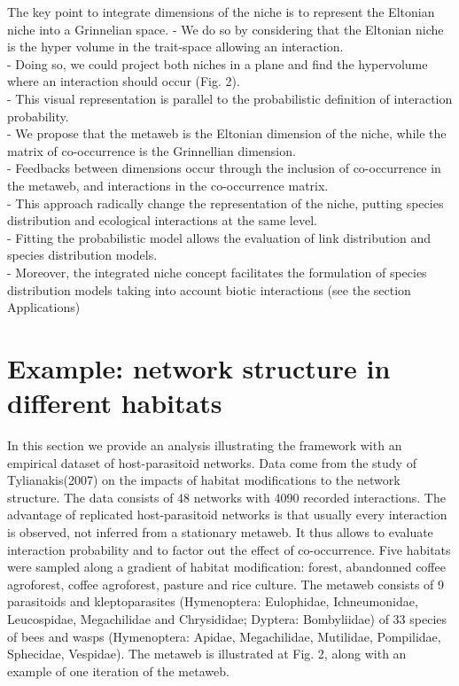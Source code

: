 \documentclass[12pt]{article}
\begin{document}
The key point to integrate dimensions of the niche is to represent the Eltonian niche into a Grinnelian space. 
- We do so by considering that the Eltonian niche is the hyper volume in the trait-space allowing an interaction. \\
- Doing so, we could project both niches in a plane and find the hypervolume where an interaction should occur (Fig. 2). \\
- This visual representation is parallel to the probabilistic definition of interaction probability. \\
- We propose that the metaweb is the Eltonian dimension of the niche, while the matrix of co-occurrence is the Grinnellian dimension. \\
- Feedbacks between dimensions occur through the inclusion of co-occurrence in the metaweb, and interactions in the co-occurrence matrix. \\
- This approach radically change the representation of the niche, putting species distribution and ecological interactions at the same level. \\
- Fitting the probabilistic model allows the evaluation of link distribution and species distribution models. \\
- Moreover, the integrated niche concept facilitates the formulation of species distribution models taking into account biotic interactions (see the section Applications) \\


\newpage
\section*{Example: network structure in different habitats}

In this section we provide an analysis illustrating the framework with an
empirical dataset of host-parasitoid networks. Data come from the study of
Tylianakis(2007) on the impacts of habitat modifications to the network
structure. The data consists of 48 networks with 4090 recorded interactions. The
advantage of replicated host-parasitoid networks is that usually every
interaction is observed, not inferred from a stationary metaweb. It thus allows
to evaluate interaction probability and to factor out the effect of
co-occurrence. Five habitats were sampled along a gradient of habitat
modification: forest, abandonned coffee agroforest, coffee agroforest, pasture
and rice culture. The metaweb consists of 9 parasitoids and kleptoparasites
(Hymenoptera: Eulophidae, Ichneumonidae, Leucospidae, Megachilidae and
Chrysididae; Dyptera: Bombyliidae) of 33 species of bees and wasps (Hymenoptera:
Apidae, Megachilidae, Mutilidae, Pompilidae, Sphecidae, Vespidae). The metaweb
is illustrated at Fig. 2, along with an example of one iteration of the metaweb.
\end{document}
